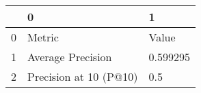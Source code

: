 \begin{tabular}{lll}
\toprule
{} &                       0 &         1 \\
\midrule
0 &                  Metric &     Value \\
1 &       Average Precision &  0.599295 \\
2 &  Precision at 10 (P@10) &       0.5 \\
\bottomrule
\end{tabular}

